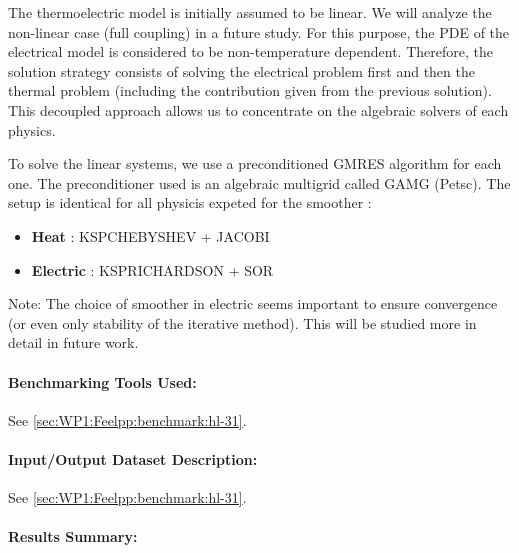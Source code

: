 The thermoelectric model is initially assumed to be linear. We will analyze the non-linear case (full coupling) in a future study.
For this purpose, the PDE of the electrical model is considered to be
non-temperature dependent. Therefore, the solution strategy consists of solving
the electrical problem first and then the thermal problem (including the
contribution given from the previous solution). This decoupled approach allows
us to concentrate on the algebraic solvers of each physics.

To solve the linear systems, we use a preconditioned GMRES algorithm for each
one. The preconditioner used is an algebraic multigrid called GAMG (Petsc). The
setup is identical for all physicis expeted for the smoother :
\begin{itemize}
\item \textbf{Heat} : KSPCHEBYSHEV + JACOBI
\item \textbf{Electric} : KSPRICHARDSON + SOR
\end{itemize}

Note: The choice of smoother in electric seems important to ensure convergence
(or even only stability of the iterative method). This will be studied more in
detail in future work.

\paragraph{Benchmarking Tools Used:} %
See \cref{sec:WP1:Feelpp:benchmark:hl-31}.

\paragraph{Input/Output Dataset Description:}
See \cref{sec:WP1:Feelpp:benchmark:hl-31}.

\paragraph{Results Summary:} %

